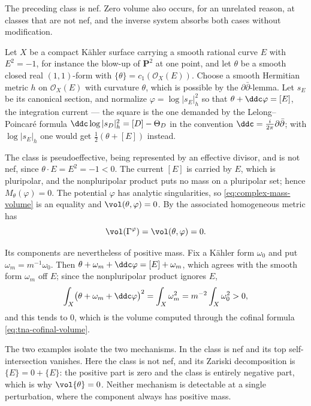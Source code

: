 \begin{example}
\label{ex:tna-rigid-negative-curve}
The preceding class is nef.  Zero volume also occurs, for an unrelated
reason, at classes that are not nef, and the inverse system absorbs both
cases without modification.

Let $X$ be a compact K\"ahler surface carrying a smooth rational curve
$E$ with $E^2=-1$, for instance the blow-up of $\mathbf P^2$ at one
point, and let $\theta$ be a smooth closed real $(1,1)$-form with
$\{\theta\}=c_1(\mathcal O_X(E))$.  Choose a smooth Hermitian metric $h$ on $\mathcal O_X(E)$ with
curvature $\theta$, which is possible by the $\partial\bar\partial$-lemma.
Let $s_E$ be its canonical section, and normalize $\varphi=\log|s_E|_h^2$ so that
$\theta+\ddc\varphi=[E]$, the integration current --- the square is the
one demanded by the Lelong--Poincar\'e formula
$\ddc\log|s_D|_h^2=[D]-\Theta_D$ in the convention
$\ddc=\tfrac{i}{2\pi}\partial\bar\partial$; with $\log|s_E|_h$ one
would get $\tfrac12(\theta+[E])$ instead.

The class is pseudoeffective, being represented by an effective divisor, and
is not nef, since $\theta\cdot E=E^2=-1<0$.  The current $[E]$ is carried
by $E$, which is pluripolar, and the nonpluripolar product puts no mass on
a pluripolar set; hence $M_\theta(\varphi)=0$.  The potential $\varphi$
has analytic singularities, so \eqref{eq:complex-mass-volume} is an equality
and $\vol(\theta,\varphi)=0$.  By
 the associated homogeneous metric has
\[
 \vol(\Gamma^\varphi)=\vol(\theta,\varphi)=0 .
\]

Its components are nevertheless of positive mass.  Fix a K\"ahler form
$\omega_0$ and put $\omega_m=m^{-1}\omega_0$.  Then
$\theta+\omega_m+\ddc\varphi=[E]+\omega_m$, which agrees with the smooth
form $\omega_m$ off $E$; since the nonpluripolar product ignores $E$,
\[
 \int_X\bigl(\theta+\omega_m+\ddc\varphi\bigr)^2
 =\int_X\omega_m^2
 =m^{-2}\int_X\omega_0^2>0 ,
\]
and this tends to $0$, which is the volume computed through the cofinal
formula \eqref{eq:tna-cofinal-volume}.

The two examples isolate the two mechanisms.  In
 the class is nef and its top
self-intersection vanishes.  Here the class is not nef, and its Zariski
decomposition is $\{E\}=0+\{E\}$: the positive part is zero and the class
is entirely negative part, which is why $\vol\{\theta\}=0$.  Neither
mechanism is detectable at a single perturbation, where the component always
has positive mass.
\end{example}

